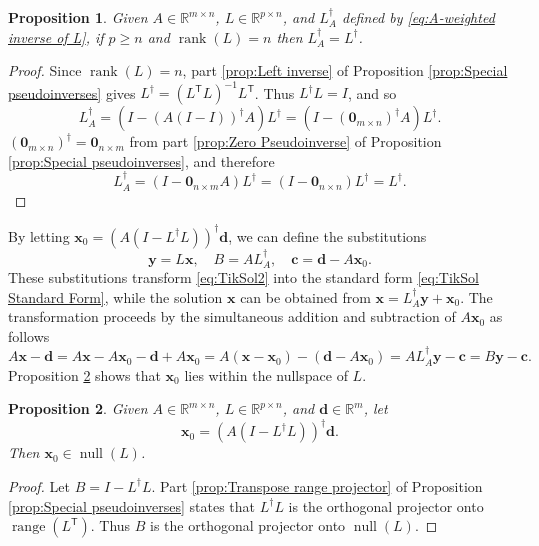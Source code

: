 \documentclass[12pt]{article}
\newcommand{\cVec}{\mathbf{c}}	%
\newcommand{\dVec}{\mathbf{d}}	%
\newcommand{\xVec}{\mathbf{x}}	%
\newcommand{\yVec}{\mathbf{y}}	%
\newcommand{\trans}[1]{{#1}^\mathsf{T}}	%
\newcommand{\inv}[1]{{#1}^{-1}}	%
\newcommand{\pinv}[1]{{#1}^\dagger}	%
\DeclareMathOperator{\rank}{rank}	%
\DeclareMathOperator{\range}{range}	%
\DeclareMathOperator{\nullspace}{null}	%
\newcommand{\zeroVec}{\bm{0}}	%
\newtheorem{proposition}{Proposition}[section]
\begin{document}
\begin{proposition}
\label{prop:Pseudoinverse of L}
Given $A \in \mathbb{R}^{m \times n}$, $L \in \mathbb{R}^{p \times n}$, and $\pinv{L}_A$ defined by \eqref{eq:A-weighted inverse of L}, if $p \geq n$ and $\rank(L) = n$ then $\pinv{L}_A = \pinv{L}$.
\end{proposition}
\begin{proof}
Since $\rank(L) = n$, part \ref{prop:Left inverse} of Proposition \ref{prop:Special pseudoinverses} gives $\pinv{L} = \inv{\left(\trans{L}L\right)}\trans{L}$. Thus $\pinv{L}L = I$, and so
\[\pinv{L}_A = \left(I - \pinv{\left(A\left(I - I\right)\right)}A\right)\pinv{L} = \left(I - \pinv{\left(\zeroVec_{m \times n}\right)}A\right)\pinv{L}.\]
$\pinv{\left(\zeroVec_{m \times n}\right)} = \zeroVec_{n \times m}$ from part \ref{prop:Zero Pseudoinverse} of Proposition \ref{prop:Special pseudoinverses}, and therefore
\[\pinv{L}_A = \left(I - \zeroVec_{n \times m}A\right)\pinv{L} = \left(I - \zeroVec_{n \times n}\right)\pinv{L} = \pinv{L}.\]
\end{proof}
\noindent By letting $\xVec_0 = \pinv{\left(A\left(I - \pinv{L}L\right)\right)}\dVec$, we can define the substitutions
\begin{equation}
\label{eq:Standard Form Substitutions}
    \yVec = L\xVec, \quad B = A\pinv{L}_A, \quad \cVec = \dVec - A\xVec_0.
\end{equation}
These substitutions transform \eqref{eq:TikSol2} into the standard form \eqref{eq:TikSol Standard Form}, while the solution $\xVec$ can be obtained from $\xVec = \pinv{L}_A \yVec + \xVec_0$. The transformation proceeds by the simultaneous addition and subtraction of $A\xVec_0$ as follows
\[A\xVec - \dVec = A\xVec - A\xVec_0 - \dVec + A\xVec_0 = A\left(\xVec - \xVec_0\right) - \left(\dVec - A\xVec_0\right) = A\pinv{L}_A \yVec - \cVec = B\yVec - \cVec.\]
Proposition \ref{prop:Nullspace of L} shows that $\xVec_0$ lies within the nullspace of $L$.

\begin{proposition}
\label{prop:Nullspace of L}
Given $A \in \mathbb{R}^{m \times n}$, $L \in \mathbb{R}^{p \times n}$, and $\dVec \in \mathbb{R}^m$, let
\[\xVec_0 = \pinv{\left(A\left(I - \pinv{L}L\right)\right)}\dVec.\]
Then $\xVec_0 \in \nullspace(L)$.
\end{proposition}
\begin{proof}
Let $B = I - \pinv{L}L$. Part \ref{prop:Transpose range projector} of Proposition \ref{prop:Special pseudoinverses} states that $\pinv{L}L$ is the orthogonal projector onto $\range(\trans{L})$. Thus $B$ is the orthogonal projector onto $\nullspace(L)$. 
\end{proof}
\end{document}
